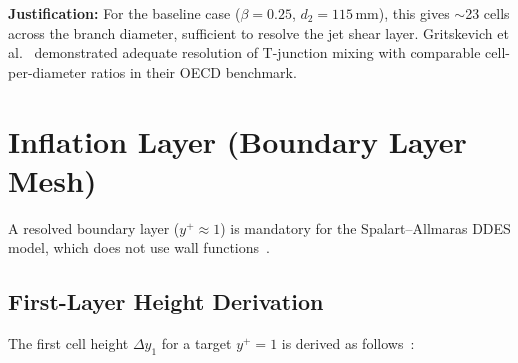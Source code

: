 \documentclass[12pt,a4paper]{report}
\begin{document}
\noindent\textbf{Justification:} For the baseline case ($\beta = 0.25$,
$d_2 = 115$\,mm), this gives $\sim$23 cells across the branch diameter,
sufficient to resolve the jet shear layer.  Gritskevich et
al.~\cite{Gritskevich2012} demonstrated adequate resolution of T-junction
mixing with comparable cell-per-diameter ratios in their OECD benchmark.


\section{Inflation Layer (Boundary Layer Mesh)}
\label{sec:inflation}

A resolved boundary layer ($y^+ \approx 1$) is mandatory for the
Spalart--Allmaras DDES model, which does not use wall
functions~\cite{SpalartAllmaras1994, Spalart2006}.

\subsection{First-Layer Height Derivation}

The first cell height $\Delta y_1$ for a target $y^+ = 1$ is derived as
follows~\cite{Schlichting2017}:
\end{document}
